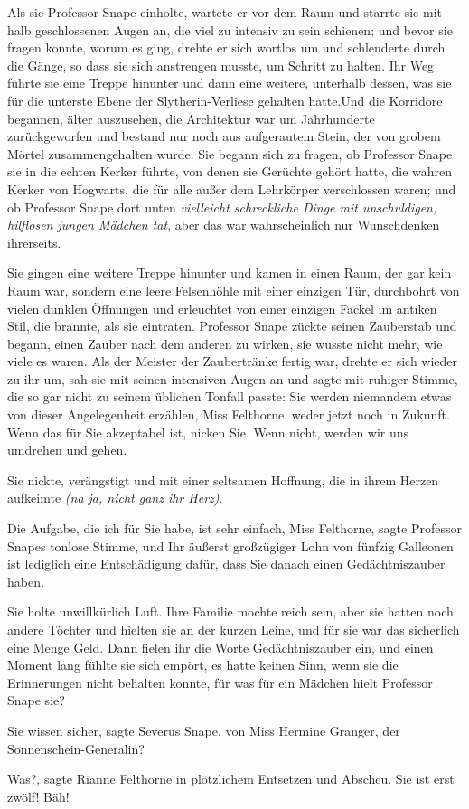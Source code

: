 Als sie Professor Snape einholte, wartete er vor dem Raum und starrte sie mit
halb geschlossenen Augen an, die viel zu intensiv zu sein schienen; und bevor
sie fragen konnte, worum es ging, drehte er sich wortlos um und schlenderte
durch die Gänge, so dass sie sich anstrengen musste, um Schritt zu halten. Ihr
Weg führte sie eine Treppe hinunter und dann eine weitere, unterhalb dessen, was
sie für die unterste Ebene der Slytherin-Verliese gehalten hatte.Und die
Korridore begannen, älter auszusehen, die Architektur war um Jahrhunderte
zurückgeworfen und bestand nur noch aus aufgerautem Stein, der von grobem Mörtel
zusammengehalten wurde. Sie begann sich zu fragen, ob Professor Snape sie in die
echten Kerker führte, von denen sie Gerüchte gehört hatte, die wahren Kerker von
Hogwarts, die für alle außer dem Lehrkörper verschlossen waren; und ob Professor
Snape dort unten\emph{ vielleicht schreckliche Dinge mit unschuldigen, hilflosen
jungen Mädchen tat}, aber das war wahrscheinlich nur Wunschdenken ihrerseits.

Sie gingen eine weitere Treppe hinunter und kamen in einen Raum, der gar kein
Raum war, sondern eine leere Felsenhöhle mit einer einzigen Tür, durchbohrt von
vielen dunklen Öffnungen und erleuchtet von einer einzigen Fackel im antiken
Stil, die brannte, als sie eintraten. Professor Snape zückte seinen Zauberstab
und begann, einen Zauber nach dem anderen zu wirken, sie wusste nicht mehr, wie
viele es waren. Als der Meister der Zaubertränke fertig war, drehte er sich
wieder zu ihr um, sah sie mit seinen intensiven Augen an und sagte mit ruhiger
Stimme, die so gar nicht zu seinem üblichen Tonfall passte: \glqq{}Sie werden
niemandem etwas von dieser Angelegenheit erzählen, Miss Felthorne, weder jetzt
noch in Zukunft. Wenn das für Sie akzeptabel ist, nicken Sie. Wenn nicht, werden
wir uns umdrehen und gehen.\grqq{}

Sie nickte, verängstigt und mit einer seltsamen Hoffnung, die in ihrem Herzen
aufkeimte \emph{(na ja, nicht ganz ihr Herz)}.

\glqq{}Die Aufgabe, die ich für Sie habe, ist sehr einfach, Miss
Felthorne\grqq{}, sagte Professor Snapes tonlose Stimme, \glqq{}und Ihr äußerst
großzügiger Lohn von fünfzig Galleonen ist lediglich eine Entschädigung dafür,
dass Sie danach einen Gedächtniszauber haben.\grqq{}

Sie holte unwillkürlich Luft. Ihre Familie mochte reich sein, aber sie hatten
noch andere Töchter und hielten sie an der kurzen Leine, und für sie war das
sicherlich eine Menge Geld. Dann fielen ihr die Worte Gedächtniszauber ein, und
einen Moment lang fühlte sie sich empört, es hatte keinen Sinn, wenn sie die
Erinnerungen nicht behalten konnte, für was für ein Mädchen hielt Professor
Snape sie?

\glqq{}Sie wissen sicher\grqq{}, sagte Severus Snape, \glqq{}von Miss Hermine
Granger, der Sonnenschein-Generalin?\grqq{}

\glqq{}Was?\grqq{}, sagte Rianne Felthorne in plötzlichem Entsetzen und Abscheu.
\glqq{}Sie ist erst zwölf! Bäh!\grqq{}

